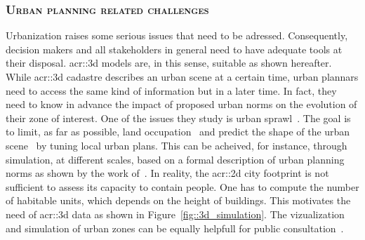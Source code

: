         \subsubsection{\textsc{Urban planning related challenges}}
            Urbanization raises some serious issues that need to be adressed.
            Consequently, decision makers and all stakeholders in general need to have adequate tools at their disposal.
            \gls{acr::3d} models are, in this sense, suitable as shown hereafter.\\
            While \gls{acr::3d} cadastre describes an urban scene at a certain time, urban plannars need to access the same kind of information but in a later time.
            In fact, they need to know in advance the impact of proposed urban norms on the evolution of their zone of interest. 
            One of the issues they study is urban sprawl~\parencite{ludlow2006urban}.
            The goal is to limit, as far as possible, land occupation~\parencite{TANNIER2012128} and predict the shape of the urban scene~\parencite{brasebin20183d} by tuning local urban plans.
            This can be acheived, for instance, through simulation, at different scales, based on a formal description of urban planning norms as shown by the work of~\textcite{Colomb17a}.
            In reality, the \gls{acr::2d} city footprint is not sufficient to assess its capacity to contain people.
            One has to compute the number of habitable units, which depends on the height of buildings.
            This motivates the need of \gls{acr::3d} data as shown in Figure~\ref{fig::3d_simulation}.
            The  vizualization and simulation of urban zones can be equally helpfull for public consultation~\parencite{WU2010291}.\\

